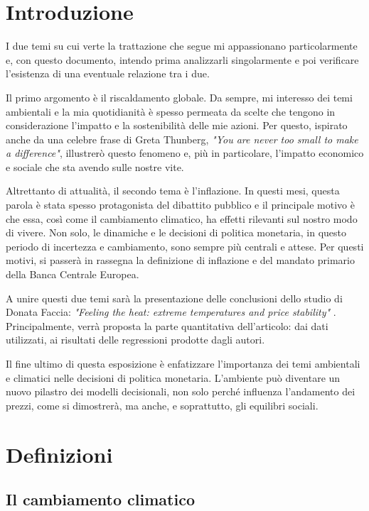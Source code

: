 \chapter{Introduzione}

I due temi su cui verte la trattazione che segue mi appassionano particolarmente e, con questo documento, intendo prima analizzarli singolarmente e poi verificare l'esistenza di una eventuale relazione tra i due.

Il primo argomento è il riscaldamento globale. Da sempre, mi interesso dei temi ambientali e la mia quotidianità è spesso permeata da scelte che tengono in considerazione l'impatto e la sostenibilità delle mie azioni. Per questo, ispirato anche da una celebre frase di Greta Thunberg, \textit{"You are never too small to make a difference"}, illustrerò questo fenomeno e, più in particolare, l'impatto economico e sociale che sta avendo sulle nostre vite.

Altrettanto di attualità, il secondo tema è l'inflazione. In questi mesi, questa parola è stata spesso protagonista del dibattito pubblico e il principale motivo è che essa, così come il cambiamento climatico, ha effetti rilevanti sul nostro modo di vivere. Non solo, le dinamiche e le decisioni di politica monetaria, in questo periodo di incertezza e cambiamento, sono sempre più centrali e attese. Per questi motivi, si passerà in rassegna la definizione di inflazione e del mandato primario della Banca Centrale Europea.

A unire questi due temi sarà la presentazione delle conclusioni dello studio di Donata Faccia: \textit{"Feeling the heat: extreme temperatures and price stability"} \parencite{ECB:feeling_heat}. Principalmente, verrà proposta la parte quantitativa dell'articolo: dai dati utilizzati, ai risultati delle regressioni prodotte dagli autori.

Il fine ultimo di questa esposizione è enfatizzare l'importanza dei temi ambientali e climatici nelle decisioni di politica monetaria. L'ambiente può diventare un nuovo pilastro dei modelli decisionali, non solo perché influenza l'andamento dei prezzi, come si dimostrerà, ma anche, e soprattutto, gli equilibri sociali.

\mainmatter

\chapter{Definizioni}
\label{chp1}

\section{Il cambiamento climatico}
\label{chp1.1}

